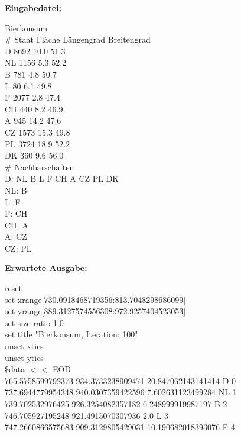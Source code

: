 \documentclass[a4paper,11pt]{article}
\begin{document}
{	\textbf{Eingabedatei:}
	\begin{mdframed}[linewidth=0pt, backgroundcolor=background, innertopmargin=10pt, innerbottommargin=10pt]
	Bierkonsum\\
	\# Staat Fläche Längengrad Breitengrad\\
	D 8692 10.0 51.3\\
	NL 1156 5.3 52.2\\
	B 781 4.8 50.7\\
	L 80 6.1 49.8\\
	F 2077 2.8 47.4\\
	CH 440 8.2 46.9\\
	A 945 14.2 47.6\\
	CZ 1573 15.3 49.8\\
	PL 3724 18.9 52.2\\
	DK 360 9.6 56.0\\
	\# Nachbarschaften\\
	D: NL B L F CH A CZ PL DK\\
	NL: B\\
	L: F\\
	F: CH\\
	CH: A\\
	A: CZ\\
	CZ: PL
\end{mdframed}
\vspace{5mm}
	\textbf{Erwartete Ausgabe:}
	\begin{mdframed}[linewidth=0pt, backgroundcolor=background, innertopmargin=10pt, innerbottommargin=10pt]
		reset\\
		set xrange[730.0918468719356:813.7048298686099]\\
		set yrange[889.3127574556308:972.9257404523053]\\
		set size ratio 1.0\\
		set title "Bierkonsum, Iteration: 100"\\
		unset xtics\\
		unset ytics\\
		\$data $<<$ EOD\\
		765.5758599792373 934.3733238909471 20.847062143141414 D 0\\
		737.6944779954348 940.0307359422596 7.602631123499284 NL 1\\
		739.702532976425 926.3254082357182 6.248999919987197 B 2\\
		746.705927195248 921.4915070307936 2.0 L 3\\
		747.2660866575683 909.3129805429031 10.190682018393076 F 4\\

\end{mdframed}}
\end{document}
